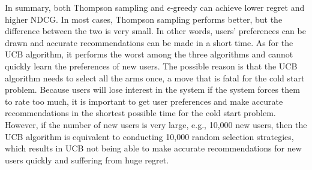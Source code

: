 In summary, both Thompson sampling and $\epsilon$-greedy can achieve lower regret and higher NDCG. In most cases, Thompson sampling performs better, but the difference between the two is very small. In other words, users' preferences can be drawn and accurate recommendations can be made in a short time. As for the UCB algorithm, it performs the worst among the three algorithms and cannot quickly learn the preferences of new users. The possible reason is that the UCB algorithm needs to select all the arms once, a move that is fatal for the cold start problem. Because users will lose interest in the system if the system forces them to rate too much\cite{threshold}, it is important to get user preferences and make accurate recommendations in the shortest possible time for the cold start problem. However, if the number of new users is very large, e.g., 10,000 new users, then the UCB algorithm is equivalent to conducting 10,000 random selection strategies, which results in UCB not being able to make accurate recommendations for new users quickly and suffering from huge regret.